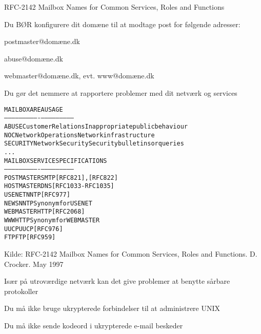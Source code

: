 \documentclass[Screen16to9,17pt]{foils}
\begin{document}

\begin{list1}
\item RFC-2142 Mailbox Names for Common Services, Roles and Functions
\item Du BØR konfigurere dit domæne til at modtage post for følgende adresser:
\begin{list2}
\item postmaster@domæne.dk
\item abuse@domæne.dk
\item webmaster@domæne.dk, evt. www@domæne.dk
\end{list2}
\item Du gør det nemmere at rapportere problemer med dit netværk og services
\end{list1}


\begin{alltt}
MAILBOX       AREA                USAGE
-----------   ----------------    ---------------------------
ABUSE         Customer Relations  Inappropriate public behaviour
NOC           Network Operations  Network infrastructure
SECURITY      Network Security    Security bulletins or queries
...
MAILBOX       SERVICE             SPECIFICATIONS
-----------   ----------------    ---------------------------
POSTMASTER    SMTP                [RFC821], [RFC822]
HOSTMASTER    DNS                 [RFC1033-RFC1035]
USENET        NNTP                [RFC977]
NEWS          NNTP                Synonym for USENET
WEBMASTER     HTTP                [RFC 2068]
WWW           HTTP                Synonym for WEBMASTER
UUCP          UUCP                [RFC976]
FTP           FTP                 [RFC959]
\end{alltt}

Kilde:
RFC-2142 Mailbox Names for Common Services, Roles and Functions. D.
Crocker. May 1997



\begin{list1}
\item Især på utroværdige netværk kan det give problemer at benytte
  sårbare protokoller
\end{list1}


\begin{list1}
\item Du må ikke bruge ukrypterede forbindelser til at administrere
  UNIX
\item Du må ikke sende kodeord i ukrypterede e-mail beskeder
\end{list1}
\end{document}

